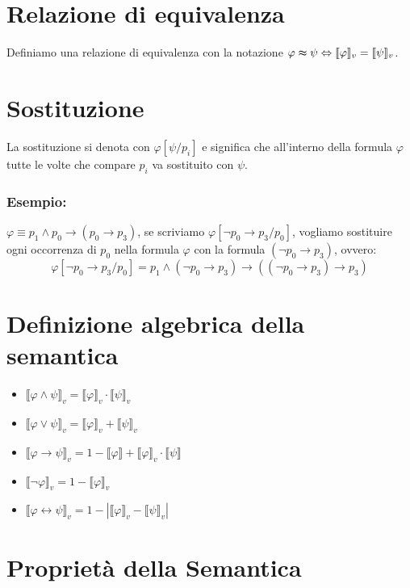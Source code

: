 \documentclass[a4paper,12pt]{report}
\newcommand\val[1]{\llbracket#1\rrbracket}
\newcommand\Iff{\Leftrightarrow}
\begin{document}
\section{Relazione di equivalenza}

Definiamo una relazione di equivalenza con la notazione $\varphi \thickapprox \psi \Iff \val{\varphi}_v = \val{\psi}_v$.

\section{Sostituzione}

La sostituzione si denota con $\varphi[\psi / p_i]$ e significa che all'interno della formula $\varphi$ tutte le volte che compare $p_i$ va sostituito con $\psi$.
\subsubsection{Esempio:}
$\varphi \equiv p_1 \wedge p_0 \to (p_0 \to p_3)$, se scriviamo $\varphi[\neg p_0 \to p_3/ p_0]$, vogliamo sostituire ogni occorrenza di $p_0$ nella formula $\varphi$ con la formula $(\neg p_0 \to p_3)$, ovvero:
\[ \varphi[\neg p_0 \to p_3/ p_0] = p_1 \wedge (\neg p_0 \to p_3) \to ((\neg p_0 \to p_3) \to p_3) \]



\section {Definizione algebrica della semantica}

\begin{itemize}
\item $\val{\varphi \wedge \psi}_v = \val{\varphi}_v \cdot \val{\psi}_v$
\item $\val{\varphi \lor \psi}_v = \val{\varphi}_v + \val{\psi}_v$
\item $\val{\varphi \to \psi}_v = 1-\val{\varphi} + \val{\varphi}_v \cdot \val{\psi}$
\item $\val{\neg\varphi}_v = 1 - \val{\varphi}_v$
\item $\val{\varphi \leftrightarrow \psi}_v = 1 - |\val{\varphi}_v - \val{\psi}_v |$
\end{itemize}

\section{Propriet\`{a} della Semantica}
\end{document}
